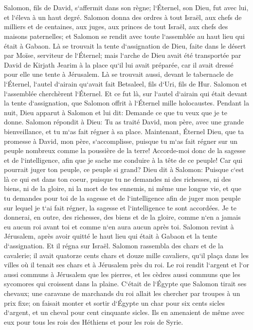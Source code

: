 

\chapter{}

\verse Salomon, fils de David, s`affermit dans son règne; l`Éternel, son Dieu, fut avec lui, et l`éleva à un haut degré. 
\verse Salomon donna des ordres à tout Israël, aux chefs de milliers et de centaines, aux juges, aux princes de tout Israël, aux chefs des maisons paternelles; 
\verse et Salomon se rendit avec toute l`assemblée au haut lieu qui était à Gabaon. Là se trouvait la tente d`assignation de Dieu, faite dans le désert par Moïse, serviteur de l`Éternel; 
\verse mais l`arche de Dieu avait été transportée par David de Kirjath Jearim à la place qu`il lui avait préparée, car il avait dressé pour elle une tente à Jérusalem. 
\verse Là se trouvait aussi, devant le tabernacle de l`Éternel, l`autel d`airain qu`avait fait Betsaleel, fils d`Uri, fils de Hur. Salomon et l`assemblée cherchèrent l`Éternel. 
\verse Et ce fut là, sur l`autel d`airain qui était devant la tente d`assignation, que Salomon offrit à l`Éternel mille holocaustes. 
\verse Pendant la nuit, Dieu apparut à Salomon et lui dit: Demande ce que tu veux que je te donne. 
\verse Salomon répondit à Dieu: Tu as traité David, mon père, avec une grande bienveillance, et tu m`as fait régner à sa place. 
\verse Maintenant, Éternel Dieu, que ta promesse à David, mon père, s`accomplisse, puisque tu m`as fait régner sur un peuple nombreux comme la poussière de la terre! 
\verse Accorde-moi donc de la sagesse et de l`intelligence, afin que je sache me conduire à la tête de ce peuple! Car qui pourrait juger ton peuple, ce peuple si grand? 
\verse Dieu dit à Salomon: Puisque c`est là ce qui est dans ton coeur, puisque tu ne demandes ni des richesses, ni des biens, ni de la gloire, ni la mort de tes ennemis, ni même une longue vie, et que tu demandes pour toi de la sagesse et de l`intelligence afin de juger mon peuple sur lequel je t`ai fait régner, 
\verse la sagesse et l`intelligence te sont accordées. Je te donnerai, en outre, des richesses, des biens et de la gloire, comme n`en a jamais eu aucun roi avant toi et comme n`en aura aucun après toi. 
\verse Salomon revint à Jérusalem, après avoir quitté le haut lieu qui était à Gabaon et la tente d`assignation. Et il régna sur Israël. 
\verse Salomon rassembla des chars et de la cavalerie; il avait quatorze cents chars et douze mille cavaliers, qu`il plaça dans les villes où il tenait ses chars et à Jérusalem près du roi. 
\verse Le roi rendit l`argent et l`or aussi communs à Jérusalem que les pierres, et les cèdres aussi communs que les sycomores qui croissent dans la plaine. 
\verse C`était de l`Égypte que Salomon tirait ses chevaux; une caravane de marchands du roi allait les chercher par troupes à un prix fixe; 
\verse on faisait monter et sortir d`Égypte un char pour six cents sicles d`argent, et un cheval pour cent cinquante sicles. Ils en amenaient de même avec eux pour tous les rois des Héthiens et pour les rois de Syrie. 

